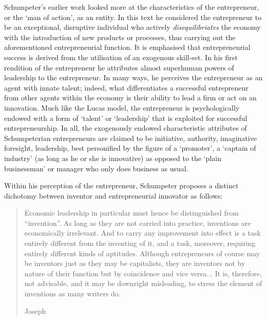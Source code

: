 Schumpeter's earlier work looked more at the characteristics of the entrepreneur, or the `man of action', as an entity. In this text he considered the entrepreneur to be an exceptional, disruptive individual who actively \emph{disequilibriates} the economy with the introduction of new products or processes, thus carrying out the aforementioned entrepreneurial function. It is emphasised that entrepreneurial success is derived from the utilisation of an exogenous skill-set. In his first rendition of the entrepreneur he attributes almost superhuman powers of leadership to the entrepreneur. In many ways, he perceives the entrepreneur as an agent with innate talent; indeed, what differentiates a successful entrepreneur from other agents within the economy is their ability to lead a firm or act on an innovation. Much like the Lucas model, the entrepreneur is psychologically endowed with a form of `talent' or `leadership' that is exploited for successful entrepreneurship. In all, the exogenously endowed characteristic attributes of Schumpeterian entrepreneurs are claimed to be initiative, authority, imaginative foresight, leadership, best personified by the figure of a `promoter', a `captain of industry' (as long as he or she is innovative) as opposed to the `plain businessman' or manager who only does business as usual.

Within his perception of the entrepreneur, Schumpeter proposes a distinct dichotomy between inventor and entrepreneurial innovator as follows:

\begin{quote}
Economic leadership in particular must hence be distinguished from ``invention''. As long as they are not carried into practice, inventions are economically irrelevant. And to carry any improvement into effect is a task entirely different from the inventing of it, and a task, moreover, requiring entirely different kinds of aptitudes. Although entrepreneurs of course may be inventors just as they may be capitalists, they are inventors not by nature of their function but by coincidence and vice versa... It is, therefore, not advisable, and it may be downright misleading, to stress the element of inventions as many writers do.
\begin{flushright}
Joseph \citet[p.~88--89]{Schumpeter1934}
\end{flushright}
\end{quote}

